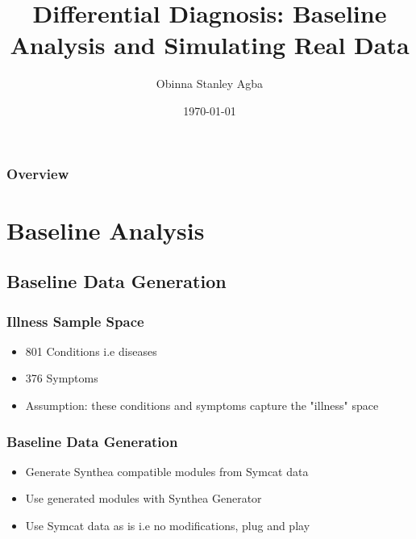 \documentclass{beamer}
\title[An Update]{Differential Diagnosis: Baseline Analysis and Simulating Real Data} %
\author{Obinna Stanley Agba} %
\institute[TU Delft] %
{
Delft University of Technology \\ %
\medskip
\textit{o.s.agba@student.tudelft.nl} %
}
\date{\today} %
\begin{document}
\begin{frame}
\titlepage %
\end{frame}

\begin{frame}
\frametitle{Overview} %
\tableofcontents %
\end{frame}


\section{Baseline Analysis} %
\subsection{Baseline Data Generation}
\begin{frame}
\frametitle{Illness Sample Space}
\begin{itemize}
	\item 801 Conditions i.e diseases
	\item 376 Symptoms
	\item Assumption: these conditions and symptoms capture the "illness" space
\end{itemize}
\end{frame}

\begin{frame}
\frametitle{Baseline Data Generation}
\begin{itemize}
	\item Generate Synthea compatible modules from Symcat data
	\item Use generated modules with Synthea Generator
	\item Use Symcat data as is i.e no modifications, plug and play
\end{itemize}
\end{frame}
\end{document}
